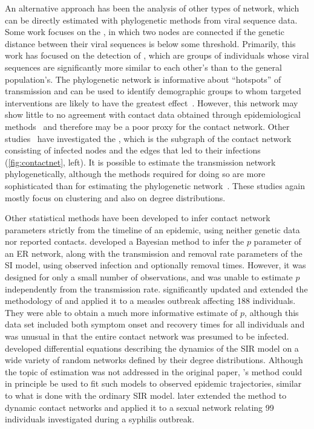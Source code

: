 An alternative approach has been the analysis of other types of network, which
can be directly estimated with phylogenetic methods from viral sequence data.
Some work focuses on the , in which two nodes are
connected if the genetic distance between their viral sequences is below some
threshold.  Primarily, this work has focused on the detection of
, which are groups of individuals whose viral
sequences are significantly more similar to each other's than to the general
population's.  The phylogenetic network is informative about ``hotspots'' of
transmission and can be used to identify demographic groups to whom targeted
interventions are likely to have the greatest effect~\autocite{poon2015impact}.
However, this network may show little to no agreement with contact data
obtained through epidemiological methods~\autocite{yirrell1998molecular,
resik2007limitations, robinson2013dynamics} and therefore may be a poor proxy
for the contact network. Other studies~\autocite{brown2011transmission} have
investigated the , which is the subgraph of the
contact network consisting of infected nodes and the edges that led to their
infections~\autocite{welch2011statistical} (\cref{fig:contactnet}, left). It is
possible to estimate the transmission network phylogenetically, although the
methods required for doing so are more sophisticated than for estimating the
phylogenetic network~\autocite{brown2011transmission}. These studies again
mostly focus on clustering and also on degree distributions.

Other statistical methods have been developed to infer contact network
parameters strictly from the timeline of an epidemic, using neither genetic
data nor reported contacts. \textcite{britton2002bayesian} developed a Bayesian
method to infer the $p$ parameter of an \gls{ER} network, along with the
transmission and removal rate parameters of the \gls{SI} model, using observed
infection and optionally removal times. However, it was designed for only a
small number of observations, and was unable to estimate $p$ independently from
the transmission rate.  \textcite{groendyke2011bayesian} significantly updated
and extended the methodology of \citeauthor{britton2002bayesian} and applied
it to a measles outbreak affecting 188 individuals. They were able to obtain a
much more informative estimate of $p$, although this data set included both
symptom onset and recovery times for all individuals and was unusual in that
the entire contact network was presumed to be infected. \textcite{volz2008sir}
developed differential equations describing the dynamics of the \gls{SIR} model
on a wide variety of random networks defined by their degree distributions.
Although the topic of estimation was not addressed in the original paper,
\citeauthor{volz2008sir}'s method could in principle be used to fit such models
to observed epidemic trajectories, similar to what is done with the ordinary
\gls{SIR} model. \textcite{volz2007susceptible} later extended the method to
dynamic contact networks and applied it to a sexual network relating 99
individuals investigated during a syphilis outbreak.

